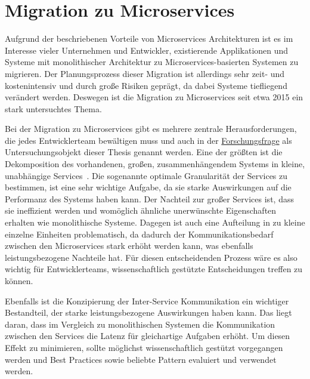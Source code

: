 \section{Migration zu Microservices}

Aufgrund der beschriebenen Vorteile von Microservices Architekturen ist es im Interesse vieler Unternehmen und Entwickler, existierende Applikationen und Systeme mit monolithischer Architektur zu Microservices-basierten Systemen zu migrieren.
Der Planungsprozess dieser Migration ist allerdings sehr zeit- und kostenintensiv und durch große Risiken geprägt, da dabei Systeme tiefliegend verändert werden.
Deswegen ist die Migration zu Microservices seit etwa 2015 ein stark untersuchtes Thema.

Bei der Migration zu Microservices gibt es mehrere zentrale Herausforderungen, die jedes Entwicklerteam bewältigen muss und auch in der \hyperref[forschungsfrage:1]{Forschungsfrage} als Untersuchungsobjekt dieser Thesis genannt werden.
Eine der größten ist die Dekomposition des vorhandenen, großen, zusammenhängendem Systems in kleine, unabhängige Services~\cite{a-survey-on,taibi2017processmotivations,taibi2019decomposition}.
Die sogenannte optimale Granularität der Services zu bestimmen, ist eine sehr wichtige Aufgabe, da sie starke Auswirkungen auf die Performanz des Systems haben kann.
Der Nachteil zur großer Services ist, dass sie ineffizient werden und womöglich ähnliche unerwünschte Eigenschaften erhalten wie monolithische Systeme.
Dagegen ist auch eine Aufteilung in zu kleine einzelne Einheiten problematisch, da dadurch der Kommunikationsbedarf zwischen den Microservices stark erhöht werden kann, was ebenfalls leistungsbezogene Nachteile hat.
Für diesen entscheidenden Prozess wäre es also wichtig für Entwicklerteams, wissenschaftlich gestützte Entscheidungen treffen zu können.

Ebenfalls ist die Konzipierung der Inter-Service Kommunikation ein wichtiger Bestandteil, der starke leistungsbezogene Auswirkungen haben kann.
Das liegt daran, dass im Vergleich zu monolithischen Systemen die Kommunikation zwischen den Services die Latenz für gleichartige Aufgaben erhöht.
Um diesen Effekt zu minimieren, sollte möglichst wissenschaftlich gestützt vorgegangen werden und Best Practices sowie beliebte Pattern evaluiert und verwendet werden.

